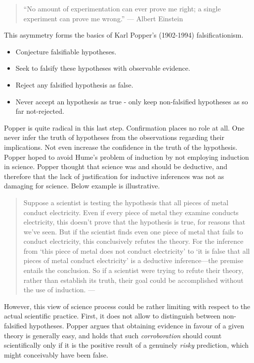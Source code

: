 \documentclass[
]{book}
\providecommand{\tightlist}{%
  \setlength{\itemsep}{0pt}\setlength{\parskip}{0pt}}
\begin{document}
\begin{quote}
``No amount of experimentation can ever prove me right; a single experiment can prove me wrong.'' --- Albert Einstein
\end{quote}

This asymmetry forms the basics of Karl Popper's (1902-1994) falsificationism.

\begin{itemize}
\tightlist
\item
  Conjecture falsifiable hypotheses.
\item
  Seek to falsify these hypotheses with observable evidence.
\item
  Reject any falsified hypothesis as false.
\item
  Never accept an hypothesis as true - only keep non-falsified hypotheses as so far not-rejected.
\end{itemize}

Popper is quite radical in this last step. Confirmation places no role at all. One never infer the truth of hypotheses from the observations regarding their implications. Not even increase the confidence in the truth of the hypothesis. Popper hoped to avoid Hume's problem of induction by not employing induction in science. Popper thought that science was and should be deductive, and therefore that the lack of justification for inductive inferences was not as damaging for science. Below example is illustrative.

\begin{quote}
Suppose a scientist is testing the hypothesis that all pieces of metal conduct electricity. Even if every piece of metal they examine conducts electricity, this doesn't prove that the hypothesis is true, for reasons that we've seen. But if the scientist finds even one piece of metal that fails to conduct electricity, this conclusively refutes the theory. For the inference from `this piece of metal does not conduct electricity' to `it is false that all pieces of metal conduct electricity' is a deductive inference---the premise entails the conclusion. So if a scientist were trying to refute their theory, rather than establish its truth, their goal could be accomplished without the use of induction. --- \citep{okasha-pos}
\end{quote}

However, this view of science process could be rather limiting with respect to the actual scientific practice. First, it does not allow to distinguish between non-falsified hypotheses. Popper argues that obtaining evidence in favour of a given theory is generally easy, and holds that such \emph{corroboration} should count scientifically only if it is the positive result of a genuinely \emph{risky} prediction, which might conceivably have been false.
\end{document}
